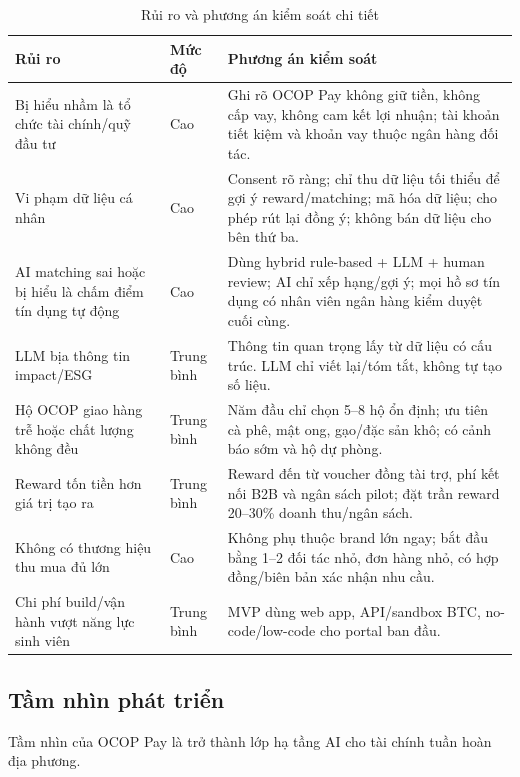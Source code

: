 \documentclass[13pt,a4paper]{extarticle}
\begin{document}
\begin{table}[H]
\centering
\caption{Rủi ro và phương án kiểm soát chi tiết}
\begin{tabular}{|p{3.5cm}|p{1.5cm}|p{8cm}|}
\hline
\textbf{Rủi ro} & \textbf{Mức độ} & \textbf{Phương án kiểm soát} \\
\hline
Bị hiểu nhầm là tổ chức tài chính/quỹ đầu tư & Cao & Ghi rõ OCOP Pay không giữ tiền, không cấp vay, không cam kết lợi nhuận; tài khoản tiết kiệm và khoản vay thuộc ngân hàng đối tác. \\
\hline
Vi phạm dữ liệu cá nhân & Cao & Consent rõ ràng; chỉ thu dữ liệu tối thiểu để gợi ý reward/matching; mã hóa dữ liệu; cho phép rút lại đồng ý; không bán dữ liệu cho bên thứ ba. \\
\hline
AI matching sai hoặc bị hiểu là chấm điểm tín dụng tự động & Cao & Dùng hybrid rule-based + LLM + human review; AI chỉ xếp hạng/gợi ý; mọi hồ sơ tín dụng có nhân viên ngân hàng kiểm duyệt cuối cùng. \\
\hline
LLM bịa thông tin impact/ESG & Trung bình & Thông tin quan trọng lấy từ dữ liệu có cấu trúc. LLM chỉ viết lại/tóm tắt, không tự tạo số liệu. \\
\hline
Hộ OCOP giao hàng trễ hoặc chất lượng không đều & Trung bình & Năm đầu chỉ chọn 5--8 hộ ổn định; ưu tiên cà phê, mật ong, gạo/đặc sản khô; có cảnh báo sớm và hộ dự phòng. \\
\hline
Reward tốn tiền hơn giá trị tạo ra & Trung bình & Reward đến từ voucher đồng tài trợ, phí kết nối B2B và ngân sách pilot; đặt trần reward 20--30\% doanh thu/ngân sách. \\
\hline
Không có thương hiệu thu mua đủ lớn & Cao & Không phụ thuộc brand lớn ngay; bắt đầu bằng 1--2 đối tác nhỏ, đơn hàng nhỏ, có hợp đồng/biên bản xác nhận nhu cầu. \\
\hline
Chi phí build/vận hành vượt năng lực sinh viên & Trung bình & MVP dùng web app, API/sandbox BTC, no-code/low-code cho portal ban đầu. \\
\hline
\end{tabular}
\end{table}

\subsection{Tầm nhìn phát triển}

Tầm nhìn của OCOP Pay là trở thành lớp hạ tầng AI cho tài chính tuần hoàn địa phương.
\end{document}

